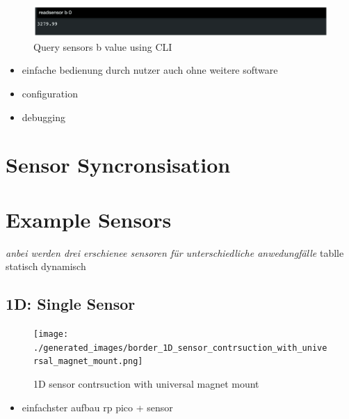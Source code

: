 \begin{figure}
\centering
\includegraphics{./generated_images/border_Query_sensors_b_value_using_CLI.png}
\caption{Query sensors b value using CLI
\label{Query_sensors_b_value_using_CLI.png}}
\end{figure}

\begin{itemize}
\tightlist
\item
  einfache bedienung durch nutzer auch ohne weitere software
\item
  configuration
\item
  debugging
\end{itemize}

\hypertarget{sensor-syncronsisation}{%
\section{\texorpdfstring{Sensor Syncronsisation
\label{CHAPTER_Sensor_Syncronsisation}}{Sensor Syncronsisation }}\label{sensor-syncronsisation}}

\hypertarget{example-sensors}{%
\section{Example Sensors}\label{example-sensors}}

\emph{anbei werden drei erschienee sensoren für unterschiedliche
anwedungfälle } tablle statisch dynamisch

\hypertarget{d-single-sensor}{%
\subsection{1D: Single Sensor}\label{d-single-sensor}}

\begin{figure}
\centering
\texttt{[image: ./generated\_images/border\_1D\_sensor\_contrsuction\_with\_universal\_magnet\_mount.png]}
\caption{1D sensor contrsuction with universal magnet mount
\label{1D_sensor_contrsuction_with_universal_magnet_mount.png}}
\end{figure}

\begin{itemize}
\tightlist
\item
  einfachster aufbau rp pico + sensor
\end{itemize}

